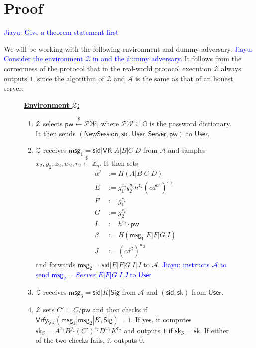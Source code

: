 \documentclass[12pt,a4paper]{article}
\newcommand{\env}{\mathcal{Z}}
\newcommand{\adv}{\mathcal{A}}
\newcommand{\user}{\mathsf{User}}
\newcommand{\sk}{\mathsf{sk}}
\newcommand{\pw}{\mathsf{pw}}
\newcommand{\newsession}{\mathsf{NewSession}}
\newcommand{\server}{\mathsf{Server}}
\newcommand{\msg}[1]{\mathsf{msg}_{#1}}
\def\xjy#1{\textcolor{blue}{Jiayu: #1}}
\begin{document}
	\section{Proof}

\xjy{Give a theorem statement first}
	
	We will be working with the following environment and dummy adversary. \xjy{Consider the environment $\env$ in  and the dummy adversary.} It follows from the correctness of the protocol that in the real-world protocol execution $\env$ always outputs $1$, since the algorithm of $\env$ and $\adv$ is the same as that of an honest server.\\
	
	\begin{figure}[h]
		\begin{framed}
			\vspace{2mm}
			\textbf{\underline{Environment $\env$:}}
			\begin{enumerate}
				\item $\env$ selects $\pw\xleftarrow{\$}\mathcal{PW}$, where $\mathcal{PW}\subseteq\mathbb{G}$ is the password dictionary. It then sends $(\newsession,\mathsf{sid},\user,\server,\pw)$ to $\user$.
				\item $\env$ receives $\msg{1} = \mathsf{sid}|\mathsf{VK}|A|B|C|D$ from $\adv$ and samples $x_2, y_2, z_2, w_2, r_2\xleftarrow{\$}\mathbb{Z}_q$. It then sets 
				\begin{align*}
					\alpha'&:=H(A|B|C|D)\\
					E &:= g_1^{x_2}g_2^{y_2}h^{z_2}(cd^{\alpha'})^{w_2}\\
					F &:= g_1^{r_2}\\
					G &:= g_2^{r_2}\\
					I &:= h^{r_2}\cdot\pw\\
					\beta &:= H(\msg{1}|E|F|G|I)\\
					J &:= (cd^{\beta})^{w_2}
				\end{align*}
			and forwards $\msg{2} = \mathsf{sid}|E|F|G|I|J$ to $\adv$. \xjy{instructs $\adv$ to send $\msg{2} = Server|E|F|G|I|J$ to $\user$}
			\item $\env$ receives $\msg{3}=\mathsf{sid}|K|\mathsf{Sig}$ from $\adv$ and $(\mathsf{sid}, \sk)$ from $\user$.
			\item $\env$ sets $C'=C/\pw$ and then checks if $\mathsf{Vrfy}_{\mathsf{VK}}(\msg{1}|\msg{2}|K,\mathsf{Sig})=1$. If yes, it computes $\sk_S=A^{x_2}B^{y_2}(C')^{z_2}D^{w_2}K^{r_2}$ and outputs $1$ if $\sk_S=\sk$. If either of the two checks fails, it outputs $0$.

\end{enumerate}
\end{framed}
\end{figure}
\end{document}
